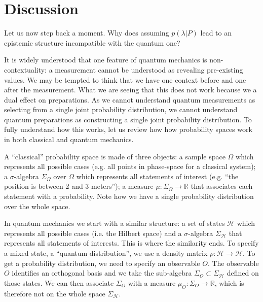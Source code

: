 \documentclass[10pt,twocolumn, nofootinbib]{revtex4-2}
\begin{document}

\section{Discussion}

Let us now step back a moment. Why does assuming $p(\lambda|P)$ lead to an epistemic structure incompatible with the quantum one?

It is widely understood that one feature of quantum mechanics is non-contextuality: a measurement cannot be understood as revealing pre-existing values. We may be tempted to think that we have one context before and one after the measurement. What we are seeing that this does not work because we a dual effect on preparations. As we cannot understand quantum measurements as selecting from a single joint probability distribution, we cannot understand quantum preparations as constructing a single joint probability distribution. To fully understand how this works, let us review how how probability spaces work in both classical and quantum mechanics.

A ``classical'' probability space is made of three objects: a sample space $\Omega$ which represents all possible cases (e.g. all points in phase-space for a classical system); a $\sigma$-algebra $\Sigma_\Omega$ over $\Omega$ which represents all statements of interest (e.g. ``the position is between 2 and 3 meters''); a measure $\mu : \Sigma_\Omega \to \mathbb{R}$ that associates each statement with a probability. Note how we have a single probability distribution over the whole space.

In quantum mechanics we start with a similar structure: a set of states $\mathcal{H}$ which represents all possible cases (i.e. the Hilbert space) and a $\sigma$-algebra $\Sigma_{\mathcal{H}}$ that represents all statements of interests. This is where the similarity ends. To specify a mixed state, a ``quantum distribution'', we use a density matrix $\rho : \mathcal{H} \to \mathcal{H}$. To get a probability distribution, we need to specify an observable $O$. The observable $O$ identifies an orthogonal basis and we take the sub-algebra $\Sigma_O \subset \Sigma_{\mathcal{H}}$ defined on those states. We can then associate $\Sigma_O$ with a measure $\mu_O : \Sigma_O \to \mathbb{R}$, which is therefore not on the whole space $\Sigma_{\mathcal{H}}$.
\end{document}
